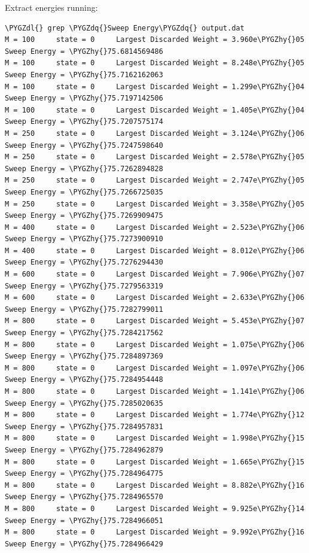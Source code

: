 \documentclass[letterpaper,10pt,english]{sphinxmanual}
\def\PYGZdl{\char`\$}
\def\PYGZhy{\char`\-}
\def\PYGZdq{\char`\"}
\begin{document}
Extract energies running:

\begin{Verbatim}[commandchars=\\\{\}]
\PYGZdl{} grep \PYGZdq{}Sweep Energy\PYGZdq{} output.dat
M = 100     state = 0     Largest Discarded Weight = 3.960e\PYGZhy{}05  Sweep Energy = \PYGZhy{}75.6814569486
M = 100     state = 0     Largest Discarded Weight = 8.248e\PYGZhy{}05  Sweep Energy = \PYGZhy{}75.7162162063
M = 100     state = 0     Largest Discarded Weight = 1.299e\PYGZhy{}04  Sweep Energy = \PYGZhy{}75.7197142506
M = 100     state = 0     Largest Discarded Weight = 1.405e\PYGZhy{}04  Sweep Energy = \PYGZhy{}75.7207575174
M = 250     state = 0     Largest Discarded Weight = 3.124e\PYGZhy{}06  Sweep Energy = \PYGZhy{}75.7247598640
M = 250     state = 0     Largest Discarded Weight = 2.578e\PYGZhy{}05  Sweep Energy = \PYGZhy{}75.7262894828
M = 250     state = 0     Largest Discarded Weight = 2.747e\PYGZhy{}05  Sweep Energy = \PYGZhy{}75.7266725035
M = 250     state = 0     Largest Discarded Weight = 3.358e\PYGZhy{}05  Sweep Energy = \PYGZhy{}75.7269909475
M = 400     state = 0     Largest Discarded Weight = 2.523e\PYGZhy{}06  Sweep Energy = \PYGZhy{}75.7273900910
M = 400     state = 0     Largest Discarded Weight = 8.012e\PYGZhy{}06  Sweep Energy = \PYGZhy{}75.7276294430
M = 600     state = 0     Largest Discarded Weight = 7.906e\PYGZhy{}07  Sweep Energy = \PYGZhy{}75.7279563319
M = 600     state = 0     Largest Discarded Weight = 2.633e\PYGZhy{}06  Sweep Energy = \PYGZhy{}75.7282799011
M = 800     state = 0     Largest Discarded Weight = 5.453e\PYGZhy{}07  Sweep Energy = \PYGZhy{}75.7284217562
M = 800     state = 0     Largest Discarded Weight = 1.075e\PYGZhy{}06  Sweep Energy = \PYGZhy{}75.7284897369
M = 800     state = 0     Largest Discarded Weight = 1.097e\PYGZhy{}06  Sweep Energy = \PYGZhy{}75.7284954448
M = 800     state = 0     Largest Discarded Weight = 1.141e\PYGZhy{}06  Sweep Energy = \PYGZhy{}75.7285020635
M = 800     state = 0     Largest Discarded Weight = 1.774e\PYGZhy{}12  Sweep Energy = \PYGZhy{}75.7284957831
M = 800     state = 0     Largest Discarded Weight = 1.998e\PYGZhy{}15  Sweep Energy = \PYGZhy{}75.7284962879
M = 800     state = 0     Largest Discarded Weight = 1.665e\PYGZhy{}15  Sweep Energy = \PYGZhy{}75.7284964775
M = 800     state = 0     Largest Discarded Weight = 8.882e\PYGZhy{}16  Sweep Energy = \PYGZhy{}75.7284965570
M = 800     state = 0     Largest Discarded Weight = 9.925e\PYGZhy{}14  Sweep Energy = \PYGZhy{}75.7284966051
M = 800     state = 0     Largest Discarded Weight = 9.992e\PYGZhy{}16  Sweep Energy = \PYGZhy{}75.7284966429

\end{Verbatim}
\end{document}
